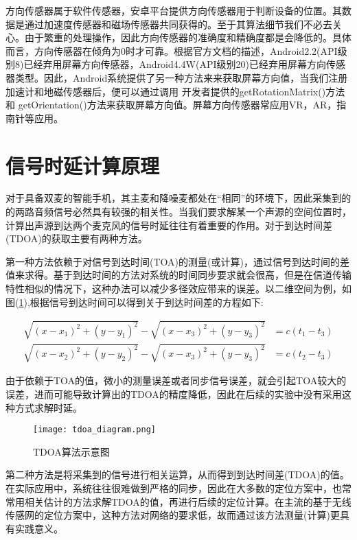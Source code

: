 \documentclass[winfonts,oneside]{njuthesis}
\begin{document}
		方向传感器属于软件传感器，安卓平台提供方向传感器用于判断设备的位置。其数据是通过加速度传感器和磁场传感器共同获得的。至于其算法细节我们不必去关心。由于繁重的处理操作，因此方向传感器的准确度和精确度都是会降低的。具体而言，方向传感器在倾角为0时才可靠。根据官方文档的描述，Android2.2(API级别8)已经弃用屏幕方向传感器，Android4.4W(API级别20)已经弃用屏幕方向传感器类型。因此，Android系统提供了另一种方法来来获取屏幕方向值，当我们注册加速计和地磁传感器后，便可以通过调用 开发者提供的getRotationMatrix()方法和 getOrientation()方法来获取屏幕方向值。屏幕方向传感器常应用VR，AR，指南针等应用。

	
	\section{信号时延计算原理}
	
		对于具备双麦的智能手机，其主麦和降噪麦都处在“相同”的环境下，因此采集到的的两路音频信号必然具有较强的相关性。当我们要求解某一个声源的空间位置时，计算出声源到达两个麦克风的信号时延往往有着重要的作用。对于到达时间差(TDOA)的获取主要有两种方法。
		
		第一种方法依赖于对信号到达时间(TOA)的测量(或计算)，通过信号到达时间的差值来求得。基于到达时间的方法对系统的时间同步要求就会很高，但是在信道传输特性相似的情况下，这种办法可以减少多径效应带来的误差。以二维空间为例，如图(\ref{fig: tdoa-diagram}),根据信号到达时间可以得到关于到达时间差的方程如下:
		
		\begin{align}
			\sqrt{(x-x_1)^2+(y-y_1)^2} - \sqrt{(x-x_3)^2+(y-y_3)^2} &= c(t_1-t_3)\\
			\sqrt{(x-x_2)^2+(y-y_2)^2} - \sqrt{(x-x_3)^2+(y-y_3)^2} &= c(t_2-t_3)
		\end{align}
		
		由于依赖于TOA的值，微小的测量误差或者同步信号误差，就会引起TOA较大的误差，进而可能导致计算出的TDOA的精度降低，因此在后续的实验中没有采用这种方式求解时延。
		
		\begin{figure}[H]
			\centering
			\texttt{[image: tdoa\_diagram.png]} 
			\caption{TDOA算法示意图}
			\label{fig: tdoa-diagram}
		\end{figure}
		
		
		第二种方法是将采集到的信号进行相关运算，从而得到到达时间差(TDOA)的值。在实际应用中，系统往往很难做到严格的同步，因此在大多数的定位方案中，也常常用相关估计的方法求解TDOA的值，再进行后续的定位计算。在主流的基于无线传感网的定位方案中，这种方法对网络的要求低，故而通过该方法测量(计算)更具有实践意义。
		
\end{document}

